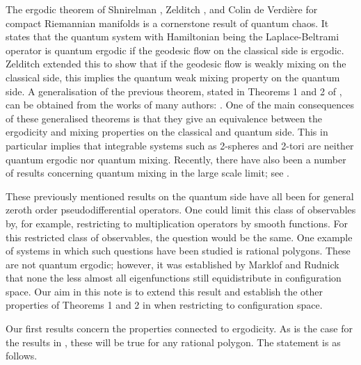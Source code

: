 \documentclass[10pt,a4paper]{amsart}
\newcommand{\1}{\mathrm{\mathbf{1}}}
\numberwithin{equation}{section}
\begin{document}
The ergodic theorem of Shnirelman \cite{shnirelmanErgodicPropertiesEigenfunctions}, Zelditch \cite{zelditchUniformDistributionEigenfunctions1987}, and Colin de Verdi\`ere \cite{colindeverdiereErgodiciteFonctionsPropres1985} for compact Riemannian manifolds is a cornerstone result of quantum chaos. It states that the quantum system with Hamiltonian being the Laplace-Beltrami operator is quantum ergodic if the geodesic flow on the classical side is ergodic. Zelditch \cite{Zel96a} extended this to show that if the geodesic flow is weakly mixing on the classical side, this implies the quantum weak mixing property on the quantum side. A generalisation of the previous theorem, stated in Theorems 1 and 2 of \cite{Zel05}, can be obtained from the works of many authors: \cite{Shn74, colindeverdiereErgodiciteFonctionsPropres1985, zelditchUniformDistributionEigenfunctions1987, Zel90, GL93, LS93, Zel96b, Zel96a, ZZ96, Sun97}. One of the main consequences of these generalised theorems is that they give an equivalence between the ergodicity and mixing properties on the classical and quantum side. This in particular implies that integrable systems such as 2-spheres and 2-tori are neither quantum ergodic nor quantum mixing. Recently, there have also been a number of results concerning quantum mixing in the large scale limit; see \cite{Hippi,bordenave2026quantummixinglargeschreier,hippi2026quantummixingschrodingereigenfunctions}.  

These previously mentioned results on the quantum side have all been for general zeroth order pseudodifferential operators. One could limit this class of observables by, for example, restricting to multiplication operators by smooth functions. For this restricted class of observables, the question would be the same. One example of systems in which such questions have been studied is rational polygons. These are not quantum ergodic; however, it was established by Marklof and Rudnick \cite{MR2879311} that none the less almost all eigenfunctions still equidistribute in configuration space. Our aim in this note is to extend this result and establish the other properties of Theorems 1 and 2 in \cite{Zel05} when restricting to configuration space.         

Our first results concern the properties connected to ergodicity. As is the case for the results in \cite{MR2879311}, these will be true for any rational polygon. The statement is as follows.
\end{document}
